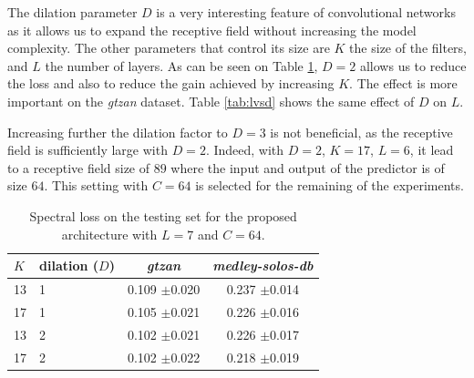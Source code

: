 \documentclass{article}
\newcommand{\fg}[1]{\textcolor{red}{FG : #1}}
\begin{document}

The dilation parameter $D$ is a very interesting feature of convolutional networks as it allows us to expand the receptive field without increasing the model complexity. The other parameters that control its size are $K$ the size of the filters, and $L$ the number of layers. As can be seen on Table \ref{tab:kvsd}, $D=2$ allows us to reduce the loss and also to reduce the gain achieved by increasing $K$. The effect is more important on the \textit{gtzan} dataset. Table \ref{tab:lvsd} shows the same effect of $D$ on $L$. %

Increasing further the dilation factor to $D=3$ is not beneficial, as the receptive field is sufficiently large with $D=2$. Indeed, with $D=2$, $K=17$, $L=6$, it lead to a receptive field size of $89$ where the input and output of the predictor is of size $64$. This setting with $C=64$ is selected for the remaining of the experiments.

%


\begin{table}[t]
  \caption{Spectral loss on the testing set for the proposed architecture with $L=7$ and $C=64$.}
  \label{tab:kvsd}
  \begin{center}
\begin{tabular}{llcc}
$K$ & dilation ($D$) & \textit{gtzan} & \textit{medley-solos-db} \\
\hline
13 & 1 & 0.109 $\pm$0.020 & 0.237 $\pm$0.014 \\
17 & 1 & 0.105 $\pm$0.021 & 0.226 $\pm$0.016 \\
13 & 2 & 0.102 $\pm$0.021 & 0.226 $\pm$0.017 \\
17 & 2 & 0.102 $\pm$0.022 & 0.218 $\pm$0.019 \\
\end{tabular}
  \end{center}
  \vspace{-4mm}
\end{table}
\end{document}
